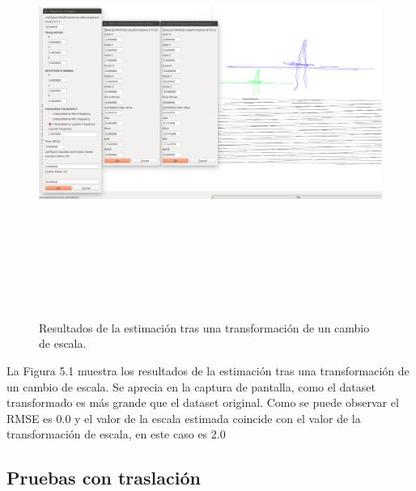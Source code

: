 \begin{figure}[H]
\label{fig:escalaTest}\includegraphics[height=14.0cm,width=18.0cm]{img/cap6/Escala_abba.png}
\hspace{0.5cm}


\caption{Resultados de la estimación tras una transformación de un cambio de escala.}
\end{figure}

La Figura 5.1 muestra los resultados de la estimación tras una transformación de un cambio de escala. Se aprecia en la captura de pantalla, como el dataset transformado es más grande que el dataset original. Como se puede observar el RMSE es 0.0 y el valor de la escala estimada coincide con el valor de la transformación de escala, en este caso es 2.0

\subsection{Pruebas con traslación}

